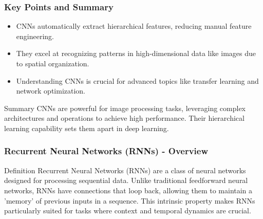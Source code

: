 \documentclass[aspectratio=169]{beamer}
\begin{document}
\begin{frame}[fragile]
    \frametitle{Key Points and Summary}
    \begin{itemize}
        \item CNNs automatically extract hierarchical features, reducing manual feature engineering.
        \item They excel at recognizing patterns in high-dimensional data like images due to spatial organization.
        \item Understanding CNNs is crucial for advanced topics like transfer learning and network optimization.
    \end{itemize}
    
    \begin{block}{Summary}
        CNNs are powerful for image processing tasks, leveraging complex architectures and operations to achieve high performance. Their hierarchical learning capability sets them apart in deep learning.
    \end{block}
\end{frame}

\begin{frame}[fragile]
    \frametitle{Recurrent Neural Networks (RNNs) - Overview}
    \begin{block}{Definition}
        Recurrent Neural Networks (RNNs) are a class of neural networks designed for processing sequential data. 
        Unlike traditional feedforward neural networks, RNNs have connections that loop back, allowing them to maintain a 'memory' of previous inputs in a sequence.
        This intrinsic property makes RNNs particularly suited for tasks where context and temporal dynamics are crucial.
    \end{block}
\end{frame}
\end{document}
